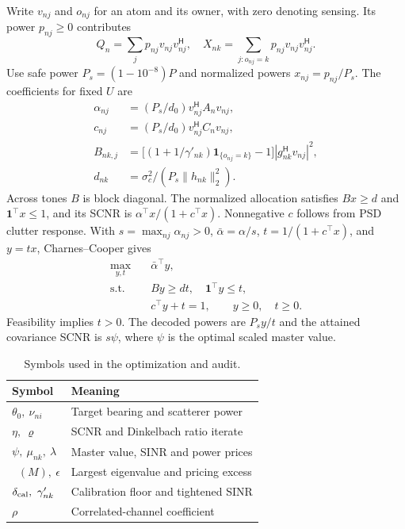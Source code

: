 \documentclass[journal]{IEEEtran}
\DeclareMathOperator{\eigmax}{eig_{\max}}
\newcommand{\HH}{^{\mathsf H}}
\newcommand{\norm}[1]{\lVert #1\rVert}
\begin{document}
Write \(v_{nj}\) and \(o_{nj}\) for an atom and its owner, with zero denoting sensing. Its power \(p_{nj}\ge0\) contributes
\begin{equation}
 Q_n=\sum_j p_{nj}v_{nj}v_{nj}\HH,\quad
 X_{nk}=\sum_{j:o_{nj}=k}p_{nj}v_{nj}v_{nj}\HH .
 \label{eq:atom}
\end{equation}
Use safe power \(P_s=(1-10^{-8})P\) and normalized powers \(x_{nj}=p_{nj}/P_s\). The coefficients for fixed \(U\) are
\begin{equation}
\begin{aligned}
 \alpha_{nj}&=(P_s/d_0)v_{nj}\HH A_nv_{nj},\\
 c_{nj}&=(P_s/d_0)v_{nj}\HH C_nv_{nj},\\
 B_{nk,j}&=\big[(1+1/\gamma'_{nk})\mathbf 1_{\{o_{nj}=k\}}-1\big]
                 |g_{nk}\HH v_{nj}|^2,\\
 d_{nk}&=\sigma_c^2/(P_s\norm{h_{nk}}_2^2).
\end{aligned}
\label{eq:coeffs}
\end{equation}
Across tones \(B\) is block diagonal. The normalized allocation satisfies \(Bx\ge d\) and \(\mathbf 1^\top x\le1\), and its SCNR is \(\alpha^\top x/(1+c^\top x)\). Nonnegative \(c\) follows from PSD clutter response. With \(s=\max_{nj}\alpha_{nj}>0\), \(\bar\alpha=\alpha/s\), \(t=1/(1+c^\top x)\), and \(y=tx\), Charnes--Cooper gives
\begin{subequations}\label{eq:lp}
\begin{align}
 \max_{y,t}\quad &\bar\alpha^\top y,\\
 \text{s.t.}\quad & By\ge dt,\quad \mathbf 1^\top y\le t,\\
 &c^\top y+t=1,\qquad y\ge0,\quad t\ge0 .
\end{align}
\end{subequations}
Feasibility implies \(t>0\). The decoded powers are \(P_s y/t\) and the attained covariance SCNR is \(s\psi\), where \(\psi\) is the optimal scaled master value.

\begin{table}[t]
 \caption{Symbols used in the optimization and audit.}
 \label{tab:symbols}
 \centering\footnotesize
 \begin{tabular}{@{}ll@{}}
 \toprule
 Symbol & Meaning\\
 \midrule
 \(\theta_0,\ \nu_{ni}\) & Target bearing and scatterer power\\
 \(\eta,\ \varrho\) & SCNR and Dinkelbach ratio iterate\\
 \(\psi,\ \mu_{nk},\ \lambda\) & Master value, SINR and power prices\\
 \(\eigmax(M),\ \epsilon\) & Largest eigenvalue and pricing excess\\
 \(\delta_{\rm cal},\ \gamma'_{nk}\) & Calibration floor and tightened SINR\\
 \(\rho\) & Correlated-channel coefficient\\
 \bottomrule
 \end{tabular}
\end{table}
\end{document}
